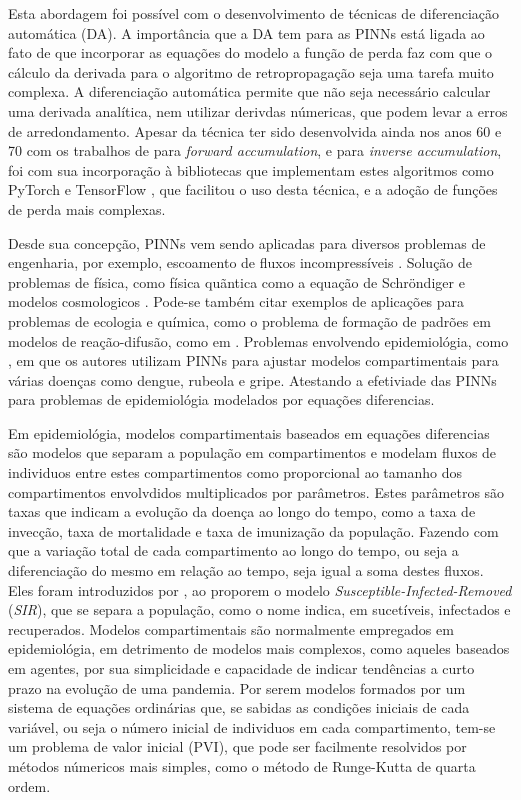 Esta abordagem foi possível com o desenvolvimento de técnicas de 
diferenciação automática (DA).
A importância que a DA tem para as PINNs está ligada ao fato de que incorporar
as equações do modelo a função de perda faz com que o cálculo da derivada 
para o algoritmo de retropropagação seja uma tarefa muito complexa. A diferenciação
automática permite que não seja necessário calcular uma derivada analítica, nem
utilizar derivdas númericas, que podem levar a erros de arredondamento.
Apesar da técnica ter sido desenvolvida ainda nos anos 60 e 70 com 
os trabalhos de \cite{wengert:64-diferenciao-automatica} 
para \textit{forward accumulation}, e \cite{linnainmaa:76-diferenciao-automatica} 
para \textit{inverse accumulation}, foi com sua incorporação à bibliotecas 
que implementam estes algoritmos como PyTorch \cite{pytorch:19} e 
TensorFlow \cite{tensorflow:16}, que facilitou o uso desta técnica,
e a adoção de funções de perda mais complexas. 

Desde sua concepção, PINNs vem sendo aplicadas para diversos problemas 
de engenharia, por exemplo, escoamento de fluxos incompressíveis 
\cite{jin-et-al:21-navier-stokes}. Solução de problemas de física, como
física quãntica como a equação de Schröndiger \cite{jin-etal:2022-schrondiger}
e modelos cosmologicos \cite{chantada-etal:2023-cosmologia}.
Pode-se também citar exemplos de aplicações para problemas de ecologia e química, 
como o problema de formação de padrões em modelos de reação-difusão, como em 
\cite{giampaolo-etal:22-gray-scott}.
Problemas envolvendo epidemiológia, como \cite{shaier-etal:22-dinns}, em que
os autores utilizam PINNs para ajustar modelos compartimentais para várias 
doenças como dengue, rubeola e gripe. Atestando a efetiviade das PINNs para 
problemas de epidemiológia modelados por equações diferencias.

Em epidemiológia, modelos compartimentais baseados em equações diferencias 
são modelos que separam a população em compartimentos e modelam fluxos de 
individuos entre estes compartimentos como proporcional ao tamanho dos 
compartimentos envolvdidos multiplicados por parâmetros. Estes parâmetros são
taxas que indicam a evolução da doença ao longo do tempo, como a taxa de invecção, 
taxa de mortalidade e taxa de imunização da população. Fazendo com que a variação 
total de cada compartimento ao longo do tempo, ou seja a diferenciação do mesmo 
em relação ao tempo, seja igual a soma destes fluxos.
Eles foram introduzidos por \cite{kermack-mcKendrick:1927}, ao proporem o modelo 
\textit{Susceptible-Infected-Removed} (\textit{SIR}), que se separa a população, 
como o nome indica, em sucetíveis, infectados e recuperados.
Modelos compartimentais são normalmente empregados em epidemiológia, 
em detrimento de modelos mais complexos, como aqueles baseados em agentes, 
por sua simplicidade e capacidade de indicar tendências a curto prazo 
na evolução de uma pandemia. 
Por serem modelos formados por um sistema de equações ordinárias que, se sabidas 
as condições iniciais de cada variável, ou seja o número inicial de individuos
em cada compartimento, tem-se um problema de valor inicial (PVI), que
pode ser facilmente resolvidos por métodos númericos mais simples, 
como o método de Runge-Kutta de quarta ordem.

